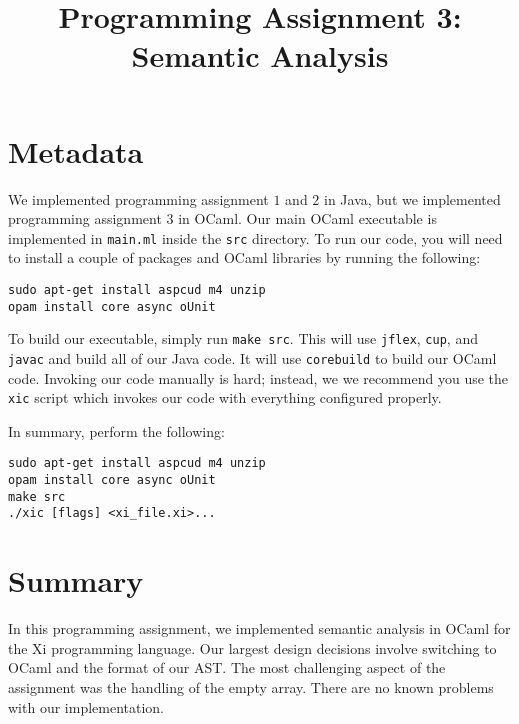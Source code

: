 \documentclass{hw}
\title{Programming Assignment 3:\\ Semantic Analysis}
\begin{document}
\maketitle

\section{Metadata}\label{sec:metadata}
We implemented programming assignment $1$ and $2$ in Java, but we implemented
programming assignment $3$ in OCaml. Our main OCaml executable is implemented
in \texttt{main.ml} inside the \texttt{src} directory. To run our code, you
will need to install a couple of packages and OCaml libraries by running the
following:

\begin{center}
\begin{BVerbatim}
sudo apt-get install aspcud m4 unzip
opam install core async oUnit
\end{BVerbatim}
\end{center}

To build our executable, simply run \texttt{make src}. This will use
\texttt{jflex}, \texttt{cup}, and \texttt{javac} and build all of our Java
code. It will use \texttt{corebuild} to build our OCaml code.  Invoking our
code manually is hard; instead, we we recommend you use the \texttt{xic} script
which invokes our code with everything configured properly.

In summary, perform the following:

\begin{center}
\begin{BVerbatim}
sudo apt-get install aspcud m4 unzip
opam install core async oUnit
make src
./xic [flags] <xi_file.xi>...
\end{BVerbatim}
\end{center}

\section{Summary}\label{sec:summary}
In this programming assignment, we implemented semantic analysis in OCaml for
the Xi programming language. Our largest design decisions involve switching to
OCaml and the format of our AST. The most challenging aspect of the assignment
was the handling of the empty array. There are no known problems with our
implementation.
\end{document}
